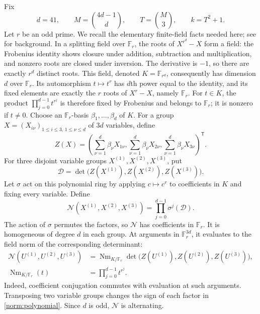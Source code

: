 Fix
\begin{equation}\label{norm:fixed-parameters}
 d=41,\qquad M=\binom{4d-1}{d},\qquad
 T=\binom{M}{3},\qquad k=T^2+1.
\end{equation}
Let $r$ be an odd prime.  We recall the elementary finite-field facts
needed here; see \cite[Chapter~2]{LidlNiederreiter1994} for background.
In a splitting field over $\mathbb F_r$, the roots of
$X^{r^d}-X$ form a field: the Frobenius identity shows closure under
addition, subtraction and multiplication, and nonzero roots are closed
under inversion.  The derivative is $-1$, so there are exactly $r^d$
distinct roots.  This field, denoted $K=\mathbb F_{r^d}$, consequently
has dimension $d$ over $\mathbb F_r$.  Its automorphism $t\mapsto t^r$
has $d$th power equal to the identity, and its fixed elements are exactly
the $r$ roots of $X^r-X$, namely $\mathbb F_r$.
For $t\in K$, the product $\prod_{j=0}^{d-1}t^{r^j}$ is therefore fixed
by Frobenius and belongs to $\mathbb F_r$; it is nonzero if $t\ne0$.
Choose an $\mathbb F_r$-basis $\beta_1,\ldots,\beta_d$ of $K$.
For a group $X=(X_{i\nu})_{1\le i\le3,\,1\le\nu\le d}$ of $3d$
variables, define
\[
 Z(X)=\left(\sum_{\nu=1}^d\beta_\nu X_{1\nu},
             \sum_{\nu=1}^d\beta_\nu X_{2\nu},
             \sum_{\nu=1}^d\beta_\nu X_{3\nu}\right)^{\mathsf T}.
\]
For three disjoint variable groups $X^{(1)},X^{(2)},X^{(3)}$, put
\[
 \mathcal D=\det\bigl(Z(X^{(1)}),Z(X^{(2)}),Z(X^{(3)})\bigr).
\]
Let $\sigma$ act on this polynomial ring by applying $c\mapsto c^r$
to coefficients in $K$ and fixing every variable.  Define
\begin{equation}\label{norm:polynomial}
 \mathcal N(X^{(1)},X^{(2)},X^{(3)})
   =\prod_{j=0}^{d-1}\sigma^j(\mathcal D).
\end{equation}
The action of $\sigma$ permutes the factors, so $\mathcal N$ has
coefficients in $\mathbb F_r$.  It is homogeneous of degree $d$ in each
group.  At arguments in $\mathbb F_r^{3d}$, it evaluates to the field norm
of the corresponding determinant:
\begin{align*}
 \mathcal N(U^{(1)},U^{(2)},U^{(3)})
  &=\operatorname{Nm}_{K/\mathbb F_r}
       \det\bigl(Z(U^{(1)}),Z(U^{(2)}),Z(U^{(3)})\bigr),\\
 \operatorname{Nm}_{K/\mathbb F_r}(t)&=\prod_{j=0}^{d-1}t^{r^j}.
\end{align*}
Indeed, coefficient conjugation commutes with evaluation at such arguments.
Transposing two variable groups changes the sign of each factor in
\eqref{norm:polynomial}.  Since $d$ is odd, $\mathcal N$ is alternating.

